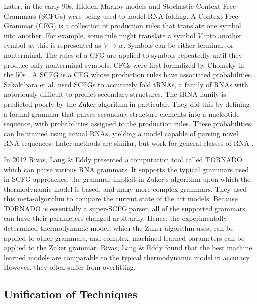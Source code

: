 \documentclass[12pt, a4paper]{article}
\begin{document}
Later, in the early 90s, Hidden Markov models and Stochastic Context Free Grammars (SCFGs) were being used to model RNA folding. A Context Free Grammar (CFG) is a collection of production rules that translate one symbol into another. For example, some rule might translate a symbol $V$ into another symbol $w$, this is represented as $V \rightarrow w$. Symbols can be either terminal, or nonterminal. The rules of a CFG are applied to symbols repeatedly until they produce only nonterminal symbols. CFGs were first formalized by Chomsky in the 50s \cite{chomsky1956three}. A SCFG is a CFG whose production rules have associated probabilities. Sakakibara et al. \cite{sakakibara1994stochastic} used SCFGs to accurately fold tRNAs, a family of RNAs with notoriously difficult to predict secondary structures. The tRNA family is predicted poorly by the Zuker algorithm in particular. They did this by defining a formal grammar that parses secondary structure elements into a nucleotide sequence, with probabilities assigned to the production rules. These probabilities can be trained using actual RNAs, yielding a model capable of parsing novel RNA sequences. Later methods are similar, but work for general classes of RNA \cite{dowell2004evaluation, knudsen2003pfold}.

In 2012 Rivas, Lang \& Eddy \cite{rivas2012range} presented a computation tool called TORNADO which can parse various RNA grammars. It supports the typical grammars used in SCFG approaches, the grammar implicit in Zuker's algorithm upon which the thermodynamic model is based, and many more complex grammars. They used this meta-algorithm to compare the current state of the art models. Because TORNADO is essentially a super-SCFG parser, all of the supported grammars can have their parameters changed arbitrarily. Hence, the experimentally determined thermodynamic model, which the Zuker algorithm uses, can be applied to other grammars, and complex, machined learned parameters can be applied to the Zuker grammar. Rivas, Lang \& Eddy found that the best machine learned models are comparable to the typical thermodynamic model in accuracy. However, they often suffer from overfitting.

\subsection{Unification of Techniques}
\end{document}
